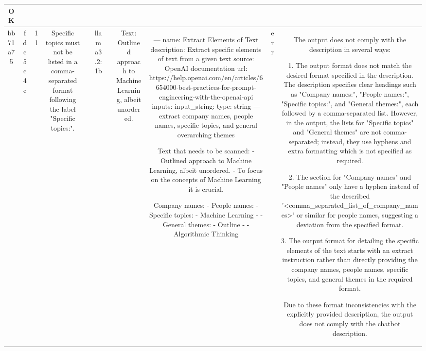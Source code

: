 \begin{table}[h!]
\begin{tabular}{|c|c|c|c|c|c|c|c|c|c|c|}
OK\\
\hline
bb71a75 & fdc5c4c & 11 & Specific topics must not be listed in a comma-separated format following the label "Specific topics:". &  & llama3.2:1b &  & Text: Outlined approach to Machine Learning, albeit unordered. & ---
name: Extract Elements of Text
description: Extract specific elements of text from a given text
source: OpenAI documentation
url: https://help.openai.com/en/articles/6654000-best-practices-for-prompt-engineering-with-the-openai-api
inputs:
  input_string:
    type: string
---
extract company names, people names, specific topics, and general overarching themes

Text that needs to be scanned:
- Outlined approach to Machine Learning, albeit unordered.
- To focus on the concepts of Machine Learning it is crucial.

Company names: - 
People names: - 
Specific topics: - Machine Learning - - 
General themes: - Outline - - Algorithmic Thinking & err & The output does not comply with the description in several ways:

1. The output format does not match the desired format specified in the description. The description specifies clear headings such as "Company names:", "People names:", "Specific topics:", and "General themes:", each followed by a comma-separated list. However, in the output, the lists for "Specific topics" and "General themes" are not comma-separated; instead, they use hyphens and extra formatting which is not specified as required.

2. The section for "Company names" and "People names" only have a hyphen instead of the described '<comma_separated_list_of_company_names>' or similar for people names, suggesting a deviation from the specified format.

3. The output format for detailing the specific elements of the text starts with an extract instruction rather than directly providing the company names, people names, specific topics, and general themes in the required format.

Due to these format inconsistencies with the explicitly provided description, the output does not comply with the chatbot description.


\end{tabular}
\end{table}

